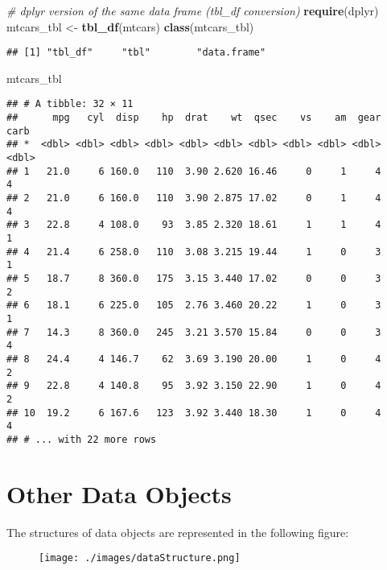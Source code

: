 \documentclass[]{book}
\newenvironment{Shaded}{\begin{snugshade}}{\end{snugshade}}
\newcommand{\KeywordTok}[1]{\textcolor[rgb]{0.13,0.29,0.53}{\textbf{{#1}}}}
\newcommand{\StringTok}[1]{\textcolor[rgb]{0.31,0.60,0.02}{{#1}}}
\newcommand{\CommentTok}[1]{\textcolor[rgb]{0.56,0.35,0.01}{\textit{{#1}}}}
\newcommand{\NormalTok}[1]{{#1}}
\begin{document}
\begin{Shaded}
\begin{Highlighting}[]
\CommentTok{# dplyr version of the same data frame (tbl_df conversion)}
\KeywordTok{require}\NormalTok{(dplyr)}
\NormalTok{mtcars_tbl <-}\StringTok{ }\KeywordTok{tbl_df}\NormalTok{(mtcars)}
\KeywordTok{class}\NormalTok{(mtcars_tbl)}
\end{Highlighting}
\end{Shaded}

\begin{verbatim}
## [1] "tbl_df"     "tbl"        "data.frame"
\end{verbatim}

\begin{Shaded}
\begin{Highlighting}[]
\NormalTok{mtcars_tbl}
\end{Highlighting}
\end{Shaded}

\begin{verbatim}
## # A tibble: 32 × 11
##      mpg   cyl  disp    hp  drat    wt  qsec    vs    am  gear  carb
## *  <dbl> <dbl> <dbl> <dbl> <dbl> <dbl> <dbl> <dbl> <dbl> <dbl> <dbl>
## 1   21.0     6 160.0   110  3.90 2.620 16.46     0     1     4     4
## 2   21.0     6 160.0   110  3.90 2.875 17.02     0     1     4     4
## 3   22.8     4 108.0    93  3.85 2.320 18.61     1     1     4     1
## 4   21.4     6 258.0   110  3.08 3.215 19.44     1     0     3     1
## 5   18.7     8 360.0   175  3.15 3.440 17.02     0     0     3     2
## 6   18.1     6 225.0   105  2.76 3.460 20.22     1     0     3     1
## 7   14.3     8 360.0   245  3.21 3.570 15.84     0     0     3     4
## 8   24.4     4 146.7    62  3.69 3.190 20.00     1     0     4     2
## 9   22.8     4 140.8    95  3.92 3.150 22.90     1     0     4     2
## 10  19.2     6 167.6   123  3.92 3.440 18.30     1     0     4     4
## # ... with 22 more rows
\end{verbatim}

\section{Other Data Objects}\label{other-data-objects}

The structures of data objects are represented in the following figure:

\begin{figure}[htbp]
\centering
\texttt{[image: ./images/dataStructure.png]}
\caption{}
\end{figure}
\end{document}
